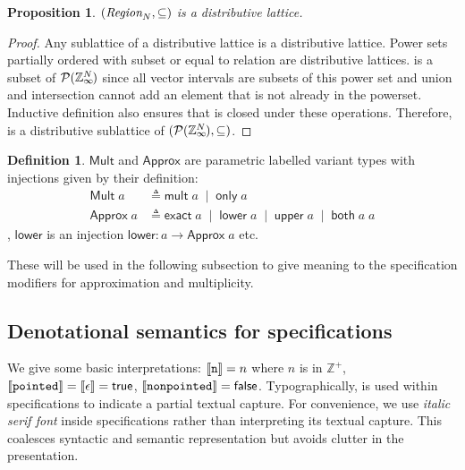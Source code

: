 \documentclass[acmlarge,review]{acmart}
\theoremstyle{definition}
\newtheorem{defn}{Definition}
\theoremstyle{plain}
\newtheorem{prop}{Proposition}
\theoremstyle{remark}
\begin{document}
\begin{prop}{}
  $(\textnormal{$\textit{Region}_{N}$},\subseteq)$ is a distributive lattice.
\end{prop}
%
\begin{proof}
  Any sublattice of a distributive lattice is a distributive lattice. Power sets
  partially ordered with subset or equal to relation are distributive lattices.
   is a subset of $\mathcal{P}{(\textnormal{$\mathbb{Z}_\infty$}{}^{\mkern-19mu{N}})}$ since all
  vector intervals are subsets of this power set and union and intersection
  cannot add an element that is not already in the powerset.  Inductive
  definition also ensures that  is closed under these operations.
  Therefore,  is a distributive sublattice of
  $(\mathcal{P}{(\textnormal{$\mathbb{Z}_\infty$}{}^{\mkern-19mu{N}})}, \subseteq)$.
\end{proof}

\begin{defn}{}
  $\mathsf{Mult}$ and $\mathsf{Approx}$ are parametric labelled variant types
  with injections given by their definition:
%
  \begin{align*}
    \mathsf{Mult} \; a &
      \triangleq \mathsf{mult} \; a \;\mid\; \mathsf{only} \; a \\
    \mathsf{Approx} \; a &
      \triangleq \mathsf{exact} \; a \;\mid\; \mathsf{lower} \; a \;\mid\;
        \mathsf{upper} \; a \;\mid\; \mathsf{both} \; a \; a
  \end{align*}
%
  \eg{}, $\mathsf{lower}$ is an injection $\mathsf{lower} : a \to \mathsf{Approx}
  \; a$ etc.

  These will be used in the following subsection to give meaning to the
  specification modifiers for approximation and multiplicity.
\end{defn}

\subsection{Denotational semantics for specifications}

We give some basic interpretations: $\llbracket{} {\texttt{n}} \rrbracket{} = n$ where $n$ is in
$\mathbb{Z}^+$, $\llbracket{} {\texttt{pointed}} \rrbracket{} = \llbracket \epsilon \rrbracket =
\mathsf{true}$, $\llbracket{} {\texttt{nonpointed}} \rrbracket{} = \mathsf{false}$.
Typographically,  is used within specifications
to indicate a partial textual capture. For convenience, we use \textit{italic
serif font} inside specifications rather than interpreting its textual capture.
This coalesces syntactic and semantic representation but avoids clutter in the
presentation.
\end{document}
